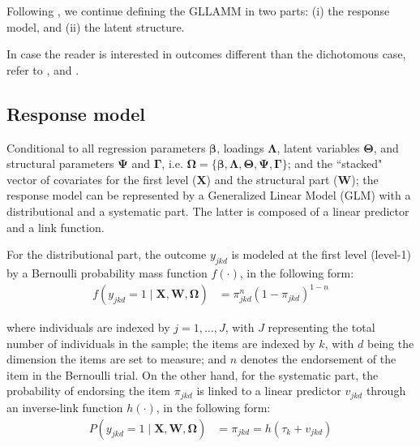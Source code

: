 Following \citet{Rabe_et_al_2004a, Rabe_et_al_2004b}, we continue defining the GLLAMM in two parts: (i) the response model, and (ii) the latent structure.

In case the reader is interested in outcomes different than the dichotomous case, refer to \citet{Rabe_et_al_2004a, Rabe_et_al_2004b, Rabe_et_al_2004c, Skrondal_et_al_2004a}, and \citet{Rabe_et_al_2012}.


\subsection{Response model} \label{s_sect:response}

Conditional to all regression parameters $\pmb{\beta}$, loadings $\pmb{\Lambda}$, latent variables $\pmb{\Theta}$, and structural parameters $\pmb{\Psi}$ and $\pmb{\Gamma}$, i.e. $\pmb{\Omega} = \{ \pmb{\beta}, \pmb{\Lambda}, \pmb{\Theta}, \pmb{\Psi}, \pmb{\Gamma} \}$; and the ``stacked" vector of covariates for the first level ($\mathbf{X}$) and the structural part ($\mathbf{W}$); the response model can be represented by a Generalized Linear Model (GLM) \cite{Nelder_et_al_1972, Nelder_et_al_1989} with a distributional and a systematic part. The latter is composed of a linear predictor and a link function.

For the distributional part, the outcome $y_{jkd}$ is modeled at the first level (level-1) by a Bernoulli probability mass function $f(\cdot)$, in the following form:
%
\begin{equation} \label{eq:distributional}
	\begin{split}
		f \left( y_{jkd}=1 \; | \; \mathbf{X}, \mathbf{W}, \pmb{\Omega} \right) &= \pi_{jkd}^{n} (1 - \pi_{jkd})^{1-n}
	\end{split}
\end{equation}

\noindent where individuals are indexed by $j = 1, \dots, J$, with $J$ representing the total number of individuals in the sample; the items are indexed by $k$, with $d$ being the dimension the items are set to measure; and $n$ denotes the endorsement of the item in the Bernoulli trial. On the other hand, for the systematic part, the probability of endorsing the item $\pi_{jkd}$ is linked to a linear predictor $v_{jkd}$ through an inverse-link function $h(\cdot)$, in the following form:
%
\begin{equation} \label{eq:systematic}
	\begin{split}
		P\left( y_{jkd}=1 \; | \; \mathbf{X}, \mathbf{W}, \pmb{\Omega} \right) &= \pi_{jkd} = h( \tau_{k} + v_{jkd} )
	\end{split}	
\end{equation}

